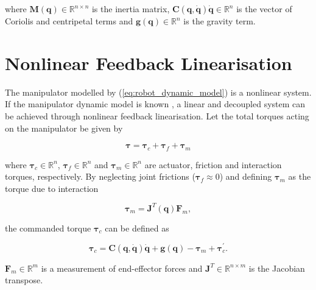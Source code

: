 where $\boldsymbol{M}(\boldsymbol{q}) \in \mathbb{R}^{n\times n}$
is the inertia matrix, $\boldsymbol{C}(\boldsymbol{q}, \dot{\boldsymbol{q}})\dot{\boldsymbol{q}} \in \mathbb{R}^n$
is
the vector of Coriolis and centripetal terms and $\boldsymbol{g}(\boldsymbol{q}) \in \mathbb{R}^n$
is the gravity term.


\section{Nonlinear Feedback Linearisation}
\label{sec:control_architectures_nonlinear_feedback_linearization}

The manipulator modelled by (\ref{eq:robot_dynamic_model}) is a nonlinear system. If the manipulator dynamic model is known \cite{Santos2018_computed_torque_control_robotic_assisted_tele_ecography}, a linear and decoupled
system can be achieved through nonlinear feedback linearisation. 
Let the total torques acting on the manipulator be given by

\begin{equation}
    \boldsymbol{\tau} = \boldsymbol{\tau}_c + \boldsymbol{\tau}_f + \boldsymbol{\tau}_m
\end{equation}

where $\boldsymbol{\tau}_c \in \mathbb{R}^n$, $\boldsymbol{\tau}_f \in \mathbb{R}^n$ and $\boldsymbol{\tau}_m \in \mathbb{R}^n$ are actuator, friction and interaction torques, respectively. By neglecting joint frictions
($\boldsymbol{\tau}_f \approx 0$) and defining $\boldsymbol{\tau}_m$ as the torque due to interaction

\begin{equation}
    \boldsymbol{\tau}_m = \boldsymbol{J}^T(\boldsymbol{q}) \boldsymbol{F}_m,
\end{equation}

the commanded torque $\boldsymbol{\tau}_c$ can be defined as

\begin{equation}
    \label{eq:tau_c}
    \boldsymbol{\tau}_c = \boldsymbol{C}(\boldsymbol{q}, \dot{\boldsymbol{q}})\dot{\boldsymbol{q}} + \boldsymbol{g}(\boldsymbol{q}) - \boldsymbol{\tau}_m +\boldsymbol{\tau}^\prime_c .
\end{equation}

$\boldsymbol{F}_m \in \mathbb{R}^m$ is a measurement of end-effector forces and $\boldsymbol{J}^T \in \mathbb{R}^{n\times m}$ is the Jacobian transpose.

